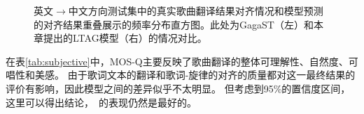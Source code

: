 \begin{figure}[!h]
    \centering
{}
\caption{英文$\rightarrow$中文方向测试集中的真实歌曲翻译结果对齐情况和模型预测的对齐结果重叠展示的频率分布直方图。此处为GagaST（左）和本章提出的LTAG模型（右）的情况对比。}
\label{fig:align_hist2}
\end{figure}
在表\ref{tab:subjective}中，MOS-Q主要反映了歌曲翻译的整体可理解性、自然度、可唱性和美感。
由于歌词文本的翻译和歌词-旋律的对齐的质量都对这一最终结果的评价有影响，因此模型之间的差异似乎不太明显。
但考虑到95\%的置信度区间，这里可以得出结论，\modelname~的表现仍然是最好的。
